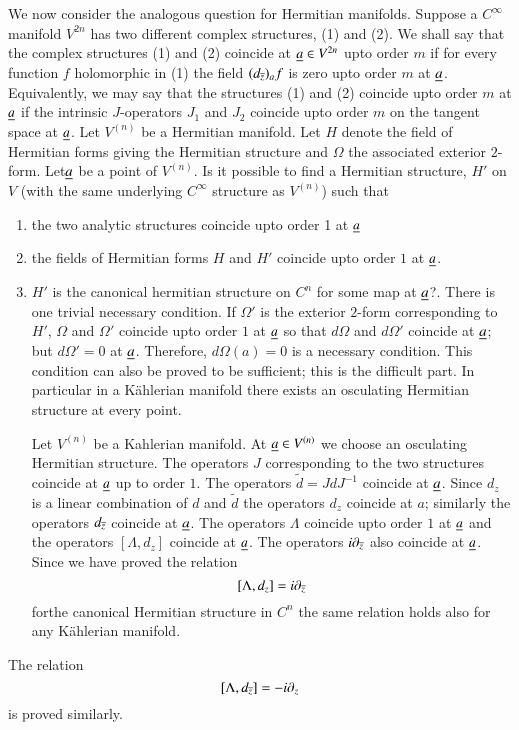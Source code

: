 We now consider the analogous question for Hermitian
manifolds. Suppose a $C^{\infty}$ manifold $V^{2n}$ has two different
complex structures, (1) and (2). We shall say that the complex
structures (1) and (2) coincide at $\underline{a}\in V^{2n}$ upto order $m$
if for every function $f$ holomorphic in (1) the field
$(d_{\overline{z}})_{a}f$ is zero upto order $m$ at $\underline{a}$. Equivalently,
we may say that the structures (1) and (2) coincide upto order $m$ at
$\underline{a}$ if the intrinsic $J$-operators $J_{1}$ and $J_{2}$ coincide
upto order $m$ on the tangent space at $\underline{a}$. Let $V^{(n)}$ be a
Hermitian manifold. Let $H$ denote the field of Hermitian forms giving
the Hermitian structure and $\Omega$ the associated exterior $2$-form.
Let\pageoriginale $\underline{a}$ be a point of $V^{(n)}$. Is it possible to
find a Hermitian structure, $H'$ on $V$ (with the same underlying
$C^{\infty}$ structure as $V^{(n)}$) such that
\begin{enumerate}
\renewcommand{\theenumi}{\roman{enumi}}
\renewcommand{\labelenumi}{\theenumi)}
\item the two analytic structures coincide upto order 1 at $\underline{a}$ 

\item the fields of Hermitian forms $H$ and $H'$ coincide upto order
  $1$ at $\underline{a}$.

\item $H'$ is the canonical hermitian structure on $C^{n}$ for some
  map at $\underline{a}$?. There is one trivial necessary condition. If
  $\Omega'$ is the exterior $2$-form corresponding to $H'$, $\Omega$
  and $\Omega'$ coincide upto order $1$ at $\underline{a}$ so that $d\Omega$
  and $d\Omega'$ coincide at $\underline{a}$; but $d\Omega'=0$ at
  $\underline{a}$. Therefore, $d\Omega(a)=0$ is a necessary condition. This
  condition can also be proved to be sufficient; this is the difficult
  part. In particular in a K\"ahlerian manifold there exists an
  osculating Hermitian structure at every point.

Let $V^{(n)}$ be a Kahlerian manifold. At $\underline{a}\in V^{(n)}$ we
choose an osculating Hermitian structure. The operators $J$
corresponding to the two structures coincide at $\underline{a}$ up to order
$1$. The operators $\widetilde{d}=JdJ^{-1}$ coincide at
$\underline{a}$. Since $d_{z}$ is a linear combination of $d$ and
$\widetilde{d}$ the operators $d_{z}$ coincide at $a$; similarly the
operators $d_{\overline{z}}$ coincide at $\underline{a}$. The operators $\Lambda$
coincide upto order $1$ at $\underline{a}$ and the operators
$[\Lambda,d_{z}]$ coincide at $\underline{a}$. The operators
$i\partial_{\overline{z}}$ also coincide at $\underline{a}$. Since we have proved
the relation
$$
[\Lambda,d_{z}]=i\partial_{\overline{z}}
$$
for\pageoriginale the canonical Hermitian structure in $C^{n}$ the
same relation holds also for any K\"ahlerian manifold.
\end{enumerate}

The relation
$$
[\Lambda,d_{\overline{z}}]=-i\partial_{z}
$$
is proved similarly.

